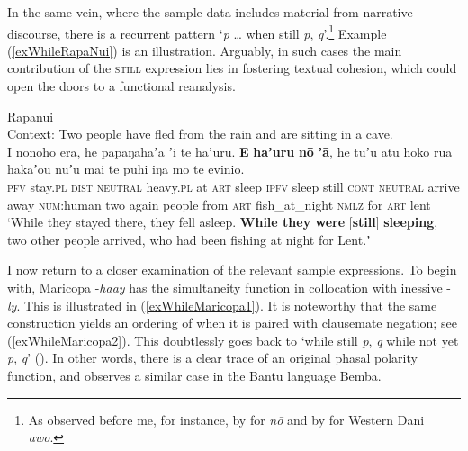 In the same  vein, where the sample data includes material from narrative discourse, there is a recurrent pattern \lq \textit{p} … when still \textit{p}, \textit{q}\rq{}.\footnote{As observed before me, for instance, by \textcite[344]{Kieviet2017} for  \textit{nō} and by \textcite[575, 619]{Barclay2008} for Western Dani \textit{awo}.} Example (\ref{exWhileRapaNui}) is an illustration. Arguably, in such cases the main contribution of the \textsc{still} expression lies in fostering textual cohesion, which could open the doors to a functional reanalysis.

\begin{exe}
	\ex Rapanui\label{exWhileRapaNui}\\
	Context: Two people have fled from the rain and are sitting in a cave.\\
	\gll I nonoho era, he papaŋahaʼa ʼi te haʼuru. \textbf{E} \textbf{haʼuru} \textbf{nō} \textbf{ʼā}, he tuʼu atu hoko rua hakaʼou nuʼu mai te puhi iŋa mo te evinio.\\
	\textsc{pfv} stay.\textsc{pl} \textsc{dist} \textsc{neutral} heavy.\textsc{pl} at \textsc{art} sleep \textsc{ipfv} sleep still \textsc{cont} \textsc{neutral} arrive away \textsc{num}:human two again people from \textsc{art} fish\_at\_night \textsc{nmlz} for \textsc{art} lent\\
\glt \lq While they stayed there, they fell asleep. \textbf{While they were} [\textbf{still}] \textbf{sleeping}, two other people arrived, who had been fishing at night for Lent.ʼ \parencite[588–589]{Kieviet2017}
\end{exe}

I now return to a closer examination of the relevant sample expressions. To begin with, Maricopa \mbox{-\textit{haay}} has the simultaneity function in collocation with inessive \mbox{-\textit{ly}}. This is illustrated in (\ref{exWhileMaricopa1}). It is noteworthy that the same construction yields an ordering of  when it is paired with clausemate negation; see (\ref{exWhileMaricopa2}). This doubtlessly goes back to \lq while still \mbox{\neg\textit{p}}, \textit{q} \equiv{ }while not yet \textit{p}, \textit{q}\rq{ }(). In other words, there is a clear trace of an original phasal polarity function, and \textcite{Gueldemann1998} observes a similar case in the Bantu language Bemba.\largerpage

